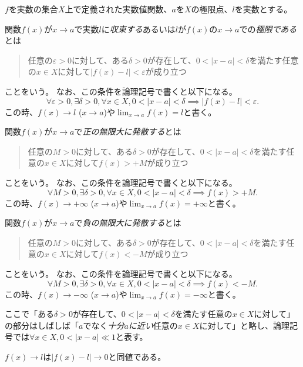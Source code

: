 \begin{definition}[関数の極限]
$f$を実数の集合$X$上で定義された実数値関数、$a$を$X$の極限点、$l$を実数とする。

関数$f(x)$が$x \to a$で実数$l$に\emph{収束する}あるいは$l$が$f(x)$の$x \to a$での\emph{極限である}とは
\begin{quote}
任意の$\varepsilon > 0$に対して、ある$\delta > 0$が存在して、$0 < |x-a| < \delta$を満たす任意の$x \in X$に対して$|f(x)-l| < \varepsilon$が成り立つ
\end{quote}
ことをいう。
なお、この条件を論理記号で書くと以下になる。
$$
\forall \varepsilon > 0, \exists \delta > 0, \forall x \in X, 0 < |x-a| < \delta \implies |f(x)-l| < \varepsilon.
$$
この時、$f(x) \to l$ ($x \to a$)や$\lim_{x \to a}f(x) = l$と書く。

関数$f(x)$が$x \to a$で\emph{正の無限大に発散する}とは
\begin{quote}
任意の$M > 0$に対して、ある$\delta > 0$が存在して、$0 < |x-a| < \delta$を満たす任意の$x \in X$に対して$f(x) > +M$が成り立つ
\end{quote}
ことをいう。
なお、この条件を論理記号で書くと以下になる。
$$
\forall M > 0, \exists \delta > 0, \forall x \in X, 0 < |x-a| < \delta \implies f(x) > +M.
$$
この時、$f(x) \to +\infty$ ($x \to a$)や$\lim_{x \to a}f(x) = +\infty$と書く。

関数$f(x)$が$x \to a$で\emph{負の無限大に発散する}とは
\begin{quote}
任意の$M > 0$に対して、ある$\delta > 0$が存在して、$0 < |x-a| < \delta$を満たす任意の$x \in X$に対して$f(x) < -M$が成り立つ
\end{quote}
ことをいう。
なお、この条件を論理記号で書くと以下になる。
$$
\forall M > 0, \exists \delta > 0, \forall x \in X, 0 < |x-a| < \delta \implies f(x) < -M.
$$
この時、$f(x) \to -\infty$ ($x \to a$)や$\lim_{x \to a}f(x) = -\infty$と書く。
\end{definition}

ここで「ある$\delta > 0$が存在して、$0 < |x-a| < \delta$を満たす任意の$x \in X$に対して」の部分はしばしば「$a$でなく\emph{十分$a$に近い}任意の$x \in X$に対して」と略し、論理記号では$\forall x \in X, 0 < |x-a| \ll 1$と表す。

$f(x) \to l$は$|f(x)-l| \to 0$と同値である。

